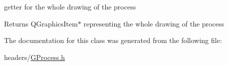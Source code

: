 getter for the whole drawing of the process 

\begin{DoxyReturn}{\-Returns}
\-Q\-Graphics\-Item$\ast$ representing the whole drawing of the process 
\end{DoxyReturn}


\-The documentation for this class was generated from the following file\-:\begin{DoxyCompactItemize}
\item 
headers/\hyperlink{_g_process_8h}{\-G\-Process.\-h}\end{DoxyCompactItemize}
